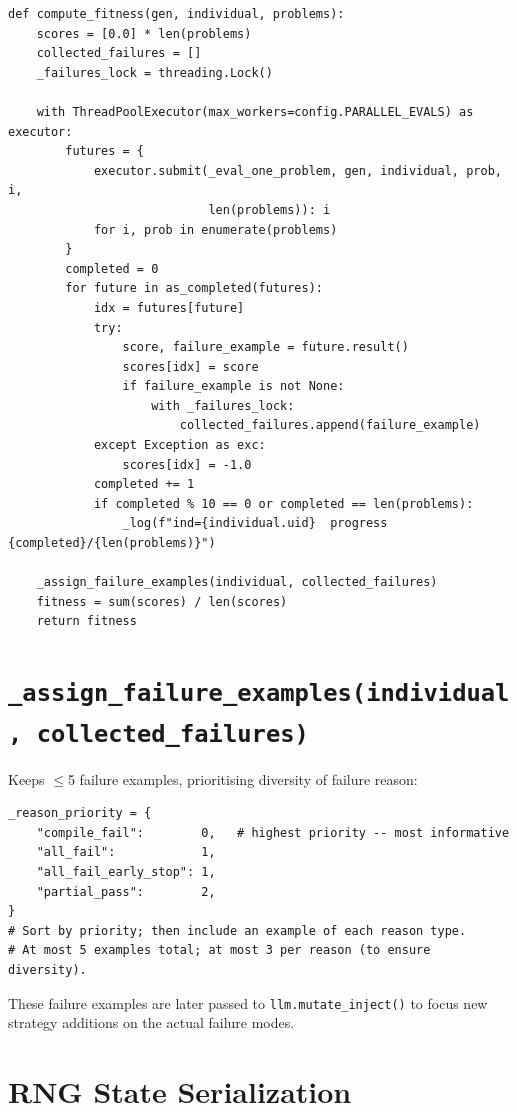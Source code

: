 \documentclass[11pt,a4paper]{report}
\newcommand{\fn}[1]{\texttt{#1}}
\begin{document}
\begin{lstlisting}[style=example]
def compute_fitness(gen, individual, problems):
    scores = [0.0] * len(problems)
    collected_failures = []
    _failures_lock = threading.Lock()

    with ThreadPoolExecutor(max_workers=config.PARALLEL_EVALS) as executor:
        futures = {
            executor.submit(_eval_one_problem, gen, individual, prob, i,
                            len(problems)): i
            for i, prob in enumerate(problems)
        }
        completed = 0
        for future in as_completed(futures):
            idx = futures[future]
            try:
                score, failure_example = future.result()
                scores[idx] = score
                if failure_example is not None:
                    with _failures_lock:
                        collected_failures.append(failure_example)
            except Exception as exc:
                scores[idx] = -1.0
            completed += 1
            if completed % 10 == 0 or completed == len(problems):
                _log(f"ind={individual.uid}  progress {completed}/{len(problems)}")

    _assign_failure_examples(individual, collected_failures)
    fitness = sum(scores) / len(scores)
    return fitness
\end{lstlisting}

\section{\fn{\_assign\_failure\_examples(individual, collected\_failures)}}

Keeps $\leq$5 failure examples, prioritising diversity of failure reason:

\begin{lstlisting}[style=example]
_reason_priority = {
    "compile_fail":        0,   # highest priority -- most informative
    "all_fail":            1,
    "all_fail_early_stop": 1,
    "partial_pass":        2,
}
# Sort by priority; then include an example of each reason type.
# At most 5 examples total; at most 3 per reason (to ensure diversity).
\end{lstlisting}

These failure examples are later passed to \fn{llm.mutate\_inject()} to focus new
strategy additions on the actual failure modes.

\section{RNG State Serialization}
\end{document}
